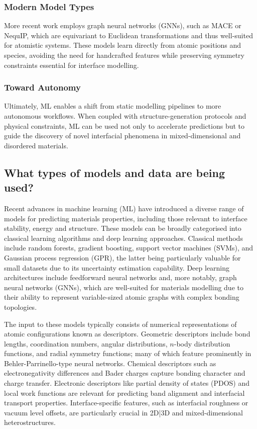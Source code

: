 \subsubsection{Modern Model Types} 
 
More recent work employs graph neural networks (GNNs), such as MACE or NequIP, which are equivariant to Euclidean transformations and thus well-suited for atomistic systems. These models learn directly from atomic positions and species, avoiding the need for handcrafted features while preserving symmetry constraints essential for interface modelling. 
 
\subsubsection{Toward Autonomy} 
 
Ultimately, ML enables a shift from static modelling pipelines to more autonomous workflows. When coupled with structure-generation protocols and physical constraints, ML can be used not only to accelerate predictions but to guide the discovery of novel interfacial phenomena in mixed-dimensional and disordered materials. 
 
\subsection{What types of models and data are being used?} 
 
Recent advances in machine learning (ML) have introduced a diverse range of models for predicting materials properties, including those relevant to interface stability, energy and structure. These models can be broadly categorised into classical learning algorithms and deep learning approaches. Classical methods include random forests, gradient boosting, support vector machines (SVMs), and Gaussian process regression (GPR), the latter being particularly valuable for small datasets due to its uncertainty estimation capability. Deep learning architectures include feedforward neural networks and, more notably, graph neural networks (GNNs), which are well-suited for materials modelling due to their ability to represent variable-sized atomic graphs with complex bonding topologies. 
 
The input to these models typically consists of numerical representations of atomic configurations known as descriptors. Geometric descriptors include bond lengths, coordination numbers, angular distributions, $n$-body distribution functions, and radial symmetry functions; many of which feature prominently in Behler-Parrinello-type neural networks. Chemical descriptors such as electronegativity differences and Bader charges capture bonding character and charge transfer. Electronic descriptors like partial density of states (PDOS) and local work functions are relevant for predicting band alignment and interfacial transport properties. Interface-specific features, such as interfacial roughness or vacuum level offsets, are particularly crucial in 2D|3D and mixed-dimensional heterostructures. 
 
